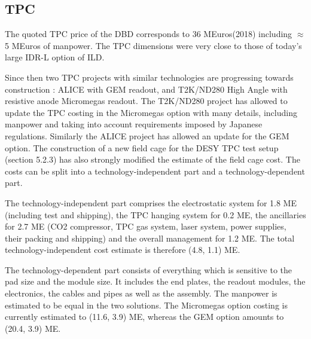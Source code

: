 \subsection{TPC}
The quoted TPC price of the DBD corresponds to 36 MEuros(2018) including $\approx$5 MEuros of manpower. The TPC dimensions  were very close to those of today's large IDR-L option of ILD.


Since then two TPC projects with similar technologies are progressing towards construction : ALICE with GEM readout, and T2K/ND280 High Angle with resistive anode Micromegas readout. The T2K/ND280 project has allowed to update the TPC costing in the Micromegas option with many details, including manpower and taking into account requirements imposed by Japanese regulations. Similarly the ALICE project has allowed an update for the GEM option. The construction of a new field cage for the DESY TPC test setup (section 5.2.3) has also strongly modified the estimate of the field cage cost. The costs can be split into a technology-independent part and a technology-dependent part.

The technology-independent part comprises the electrostatic system for 1.8 ME (including test and shipping), the TPC hanging system for 0.2 ME, the ancillaries for 2.7 ME (CO2 compressor, TPC gas system, laser system, power supplies, their packing and shipping) and the overall management for 1.2 ME. The total technology-independent cost estimate is therefore (4.8, 1.1) ME.

The technology-dependent part consists of everything which is sensitive to the pad size and the module size. It includes the end plates, the readout modules, the electronics, the cables and pipes as well as the assembly. The manpower is estimated to be equal in the two solutions. The Micromegas option costing is currently estimated to (11.6, 3.9) ME, whereas the GEM option amounts to (20.4, 3.9) ME.

